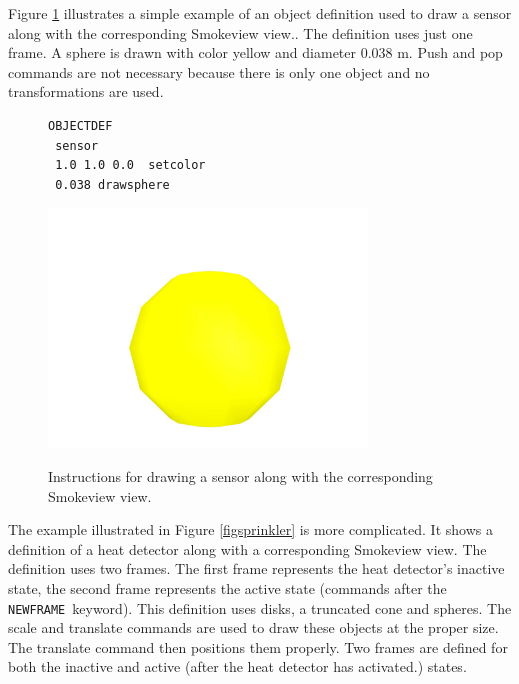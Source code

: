 \documentclass[11pt,twoside]{book}
\newcommand{\figoptions}{hbp}
\newcommand{\figheightA}{2.5in}
\begin{document}
Figure \ref{figsensor} illustrates a simple example of an object
definition used to draw a sensor along with the corresponding
Smokeview view.. The definition uses just one frame. A sphere is
drawn with color yellow and diameter 0.038 m. Push and pop commands
are not necessary because there is only one object and no
transformations are used.
\begin{figure}[\figoptions]
{\small
\begin{Verbatim}[frame=single,rulecolor=\color{blue},
framerule=3pt,framesep=1pc,fillcolor=\color{yellow}]
OBJECTDEF
 sensor
 1.0 1.0 0.0  setcolor
 0.038 drawsphere
\end{Verbatim}
}
\begin{center}
\includegraphics[height=\figheightA]{figures/sensorplain}\\
\end{center}
\caption{Instructions for drawing a sensor along with the corresponding Smokeview view.}
\label{figsensor}%
\end{figure}

The example illustrated in Figure \ref{figsprinkler} is more complicated.
It shows a
definition of a heat detector along with a corresponding
Smokeview view. The definition uses two frames. The first frame
represents the heat detector's inactive state, the second frame
represents the active state (commands after the {\tt NEWFRAME}\
keyword). This definition uses disks, a truncated cone and spheres.
The scale and translate commands are used to draw these objects at the proper size.
The translate command then positions them properly.  Two frames are defined for both the inactive and active (after the heat
detector has activated.) states.
\end{document}
